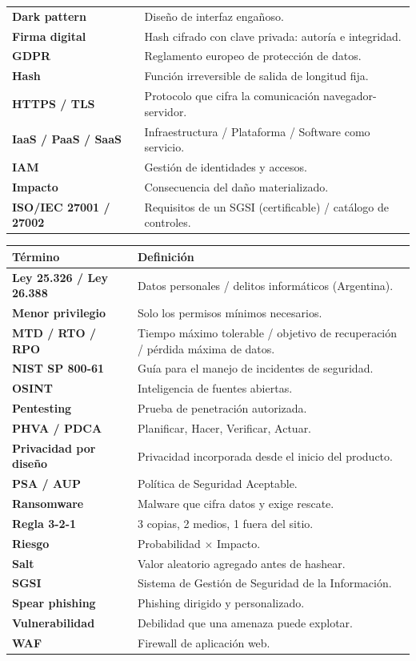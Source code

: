 \documentclass[12pt,a4paper]{article}
\begin{document}
{\begin{tabularx}{\textwidth}{>{\bfseries}p{4.2cm}X}
Dark pattern & Dise\~no de interfaz enga\~noso. \\
Firma digital & Hash cifrado con clave privada: autor\'ia e integridad. \\
GDPR & Reglamento europeo de protecci\'on de datos. \\
Hash & Funci\'on irreversible de salida de longitud fija. \\
HTTPS / TLS & Protocolo que cifra la comunicaci\'on navegador-servidor. \\
IaaS / PaaS / SaaS & Infraestructura / Plataforma / Software como servicio. \\
IAM & Gesti\'on de identidades y accesos. \\
Impacto & Consecuencia del da\~no materializado. \\
ISO/IEC 27001 / 27002 & Requisitos de un SGSI (certificable) / cat\'alogo de controles. \\
\bottomrule
\end{tabularx}

\begin{tabularx}{\textwidth}{>{\bfseries}p{4.2cm}X}
\toprule
T\'ermino & Definici\'on \\
\midrule
Ley 25.326 / Ley 26.388 & Datos personales / delitos inform\'aticos (Argentina). \\
Menor privilegio & Solo los permisos m\'inimos necesarios. \\
MTD / RTO / RPO & Tiempo m\'aximo tolerable / objetivo de recuperaci\'on / p\'erdida m\'axima de datos. \\
NIST SP 800-61 & Gu\'ia para el manejo de incidentes de seguridad. \\
OSINT & Inteligencia de fuentes abiertas. \\
Pentesting & Prueba de penetraci\'on autorizada. \\
PHVA / PDCA & Planificar, Hacer, Verificar, Actuar. \\
Privacidad por dise\~no & Privacidad incorporada desde el inicio del producto. \\
PSA / AUP & Pol\'itica de Seguridad Aceptable. \\
Ransomware & Malware que cifra datos y exige rescate. \\
Regla 3-2-1 & 3 copias, 2 medios, 1 fuera del sitio. \\
Riesgo & Probabilidad $\times$ Impacto. \\
Salt & Valor aleatorio agregado antes de hashear. \\
SGSI & Sistema de Gesti\'on de Seguridad de la Informaci\'on. \\
Spear phishing & Phishing dirigido y personalizado. \\
Vulnerabilidad & Debilidad que una amenaza puede explotar. \\
WAF & Firewall de aplicaci\'on web. \\
\bottomrule
\end{tabularx}
}
\end{document}
